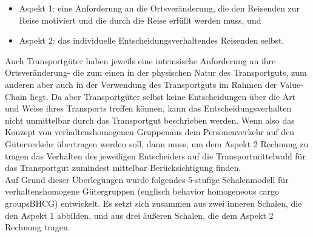 \begin{itemize}
%
   \item Aspekt 1: eine \glqq Anforderung an die Ortsveränderung\grqq , die den Reisenden zur Reise motiviert und die durch die Reise erfüllt werden muss, und
   \item Aspekt 2: das \glqq individuelle Entscheidungsverhalten\grqq  des Reisenden selbst.
%
\end{itemize}
Auch Transportgüter haben jeweils eine \glqq intrinsische Anforderung an ihre Ortsveränderung\grqq  - die zum einen in der physischen Natur des Transportguts, zum anderen aber auch in der Verwendung des Transportguts im Rahmen der Value-Chain liegt. Da aber Transportgüter selbst keine Entscheidungen über die Art und Weise ihres Transports treffen können, kann das Entscheidungsverhalten nicht unmittelbar durch das Transportgut beschrieben werden. Wenn also das Konzept von \glqq verhaltenshomogenen Gruppen\grqq  aus dem Personenverkehr auf den Güterverkehr übertragen werden soll, dann muss, um dem Aspekt 2 Rechnung zu tragen das Verhalten des jeweiligen Entscheiders auf die Transportmittelwahl für das Transportgut zumindest mittelbar Berücksichtigung finden.~\\
Auf Grund dieser Überlegungen wurde folgendes 5-stufige Schalenmodell für verhaltenshomogene Gütergruppen (englisch \glqq behavior homogeneous cargo groups\grqq  BHCG) entwickelt. Es setzt sich zusammen aus zwei inneren Schalen, die den Aspekt 1 abbilden, und aus drei äußeren Schalen, die dem Aspekt 2 Rechnung tragen.~\\

